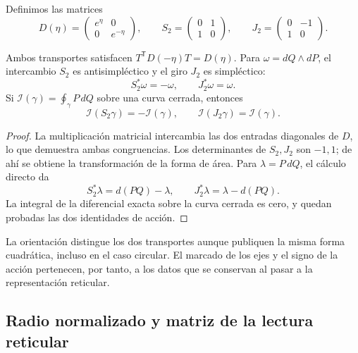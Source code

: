 Definimos las matrices
\begin{equation}
 D(\eta)=\begin{pmatrix}e^\eta&0\\0&e^{-\eta}\end{pmatrix},
 \qquad
 S_2=\begin{pmatrix}0&1\\1&0\end{pmatrix},
 \qquad
 J_2=\begin{pmatrix}0&-1\\1&0\end{pmatrix}.
 \label{x_reciprocidad:iv:ellipse:transportes}
\end{equation}

\begin{proposition}
\label{x_reciprocidad:iv:ellipse:accion-reciproca}
Ambos transportes satisfacen
\(T^{\mathsf T}D(-\eta)T=D(\eta)\).
Para \(\omega=dQ\wedge dP\), el intercambio \(S_2\) es
antisimpléctico y el giro \(J_2\) es simpléctico:
\[
 S_2^*\omega=-\omega,\qquad J_2^*\omega=\omega.
\]
Si \(\mathcal I(\gamma)=\oint_\gamma P\,dQ\) sobre una
curva cerrada, entonces
\begin{equation}
 \mathcal I(S_2\gamma)=-\mathcal I(\gamma),\qquad
 \mathcal I(J_2\gamma)=\mathcal I(\gamma).
 \label{x_reciprocidad:iv:ellipse:signos-accion}
\end{equation}
\end{proposition}
\begin{proof}
La multiplicación matricial intercambia las dos entradas
diagonales de \(D\), lo que demuestra ambas congruencias.
Los determinantes de \(S_2,J_2\) son \(-1,1\);
de ahí se obtiene la transformación de la forma de área.
Para \(\lambda=P\,dQ\), el cálculo directo da
\[
 S_2^*\lambda=d(PQ)-\lambda,\qquad
 J_2^*\lambda=\lambda-d(PQ).
\]
La integral de la diferencial exacta sobre la curva cerrada
es cero, y quedan probadas las dos identidades de acción.
\end{proof}

La orientación distingue los dos transportes aunque publiquen
la misma forma cuadrática, incluso en el caso circular.
El marcado de los ejes y el signo de la acción pertenecen,
por tanto, a los datos que se conservan al pasar a la
representación reticular.

\subsection{Radio normalizado y matriz de la lectura reticular}
\label{x_reciprocidad:iv:ellipse:radio}

